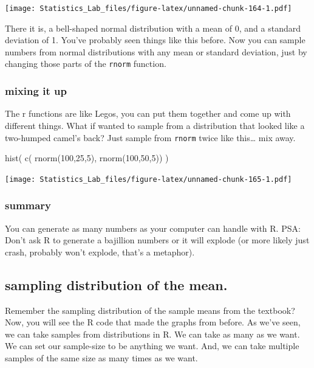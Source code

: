 \documentclass[
]{book}
\newenvironment{Shaded}{\begin{snugshade}}{\end{snugshade}}
\newcommand{\DecValTok}[1]{\textcolor[rgb]{0.00,0.00,0.81}{#1}}
\newcommand{\FunctionTok}[1]{\textcolor[rgb]{0.00,0.00,0.00}{#1}}
\newcommand{\NormalTok}[1]{#1}
\begin{document}
\texttt{[image: Statistics\_Lab\_files/figure-latex/unnamed-chunk-164-1.pdf]}

There it is, a bell-shaped normal distribution with a mean of 0, and a standard deviation of 1. You've probably seen things like this before. Now you can sample numbers from normal distributions with any mean or standard deviation, just by changing those parts of the \texttt{rnorm} function.

\hypertarget{mixing-it-up}{%
\subsubsection{mixing it up}\label{mixing-it-up}}

The r functions are like Legos, you can put them together and come up with different things. What if wanted to sample from a distribution that looked like a two-humped camel's back? Just sample from \texttt{rnorm} twice like this\ldots{} mix away.

\begin{Shaded}
\begin{Highlighting}[]
\FunctionTok{hist}\NormalTok{( }\FunctionTok{c}\NormalTok{( }\FunctionTok{rnorm}\NormalTok{(}\DecValTok{100}\NormalTok{,}\DecValTok{25}\NormalTok{,}\DecValTok{5}\NormalTok{), }\FunctionTok{rnorm}\NormalTok{(}\DecValTok{100}\NormalTok{,}\DecValTok{50}\NormalTok{,}\DecValTok{5}\NormalTok{)) )}
\end{Highlighting}
\end{Shaded}

\texttt{[image: Statistics\_Lab\_files/figure-latex/unnamed-chunk-165-1.pdf]}

\hypertarget{summary}{%
\subsubsection{summary}\label{summary}}

You can generate as many numbers as your computer can handle with R. PSA: Don't ask R to generate a bajillion numbers or it will explode (or more likely just crash, probably won't explode, that's a metaphor).

\hypertarget{sampling-distribution-of-the-mean.}{%
\subsection{sampling distribution of the mean.}\label{sampling-distribution-of-the-mean.}}

Remember the sampling distribution of the sample means from the textbook? Now, you will see the R code that made the graphs from before. As we've seen, we can take samples from distributions in R. We can take as many as we want. We can set our sample-size to be anything we want. And, we can take multiple samples of the same size as many times as we want.
\end{document}
